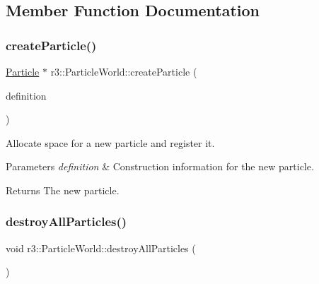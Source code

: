 \subsection{Member Function Documentation}
\mbox{\label{classr3_1_1_particle_world_a5df8f4d242ab19e7e1a9830ef6131c3c}} 
\subsubsection{\texorpdfstring{create\+Particle()}{createParticle()}}
{\footnotesize\ttfamily \mbox{\hyperlink{classr3_1_1_particle}{Particle}} $\ast$ r3\+::\+Particle\+World\+::create\+Particle (\begin{DoxyParamCaption}\item[{\mbox{\hyperlink{structr3_1_1_particle_def}{Particle\+Def}}}]{definition }\end{DoxyParamCaption})}



Allocate space for a new particle and register it. 


\begin{DoxyParams}{Parameters}
{\em definition} & Construction information for the new particle. \\
\hline
\end{DoxyParams}
\begin{DoxyReturn}{Returns}
The new particle. 
\end{DoxyReturn}
\mbox{\label{classr3_1_1_particle_world_aa061b4eab09216fb7e3a8d08cbdb6dd2}} 
\subsubsection{\texorpdfstring{destroy\+All\+Particles()}{destroyAllParticles()}}
{\footnotesize\ttfamily void r3\+::\+Particle\+World\+::destroy\+All\+Particles (\begin{DoxyParamCaption}{ }\end{DoxyParamCaption})}




